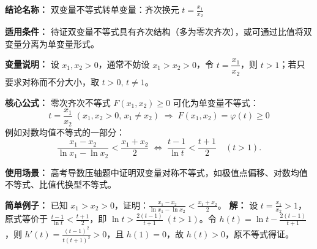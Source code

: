 \textbf{结论名称：} 双变量不等式转单变量：齐次换元 \( t = \frac{x_1}{x_2} \)

\textbf{适用条件：} 待证双变量不等式具有齐次结构（多为零次齐次），或可通过比值将双变量分离为单变量形式。

\textbf{变量说明：} 设 \( x_1, x_2 > 0 \)，通常不妨设 \( x_1 > x_2 > 0 \)，令 \( t = \dfrac{x_1}{x_2} \)，则 \( t > 1 \)；若只要求对称而不分大小，取 \( t>0, \, t\neq 1 \)。

\textbf{核心公式：}
零次齐次不等式 \( F(x_1,x_2) \ge 0 \) 可化为单变量不等式：
\[
\boxed{ t = \frac{x_1}{x_2} \;(x_1,x_2>0,\,x_1\neq x_2) \;\Longrightarrow\; F(x_1,x_2) = \varphi(t) \ge 0 }
\]
例如对数均值不等式的一部分：
\[
\frac{x_1 - x_2}{\ln x_1 - \ln x_2} < \frac{x_1 + x_2}{2}
\;\Longleftrightarrow\;
\frac{t - 1}{\ln t} < \frac{t + 1}{2} \quad (t>1).
\]

\textbf{使用场景：} 高考导数压轴题中证明双变量对称不等式，如极值点偏移、对数均值不等式、比值代换型不等式。

\textbf{简单例子：}
已知 \( x_1 > x_2 > 0 \)，证明：\( \displaystyle \frac{x_1 - x_2}{\ln x_1 - \ln x_2} < \frac{x_1 + x_2}{2} \)。
\textbf{解：} 设 \( t = \frac{x_1}{x_2} > 1 \)，原式等价于 \( \frac{t - 1}{\ln t} < \frac{t + 1}{2} \)，即 \( \ln t > \frac{2(t - 1)}{t + 1} \;(t>1) \)。令 \( h(t) = \ln t - \frac{2(t - 1)}{t + 1} \)，则 \( h'(t) = \frac{(t-1)^2}{t(t+1)^2} > 0 \)，且 \( h(1)=0 \)，故 \( h(t)>0 \)，原不等式得证。